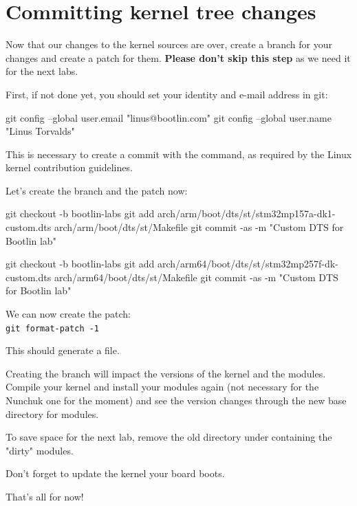 \section{Committing kernel tree changes}

Now that our changes to the kernel sources are over,
create a branch for your changes and create a patch for them.
{\bf Please don't skip this step} as we need it for the next labs.

First, if not done yet, you should set your identity
and e-mail address in git:

\begin{bashinput}
git config --global user.email "linus@bootlin.com"
git config --global user.name "Linus Torvalds"
\end{bashinput}

This is necessary to create a commit with the 
command, as required by the Linux kernel contribution guidelines.

Let's create the branch and the patch now:

\if{}
\begin{bashinput}
git checkout -b bootlin-labs
git add arch/arm/boot/dts/st/stm32mp157a-dk1-custom.dts arch/arm/boot/dts/st/Makefile
git commit -as -m "Custom DTS for Bootlin lab"
\end{bashinput}
\fi
\if{}
\begin{bashinput}
git checkout -b bootlin-labs
git add arch/arm64/boot/dts/st/stm32mp257f-dk-custom.dts arch/arm64/boot/dts/st/Makefile
git commit -as -m "Custom DTS for Bootlin lab"
\end{bashinput}
\fi

We can now create the patch:\\
\texttt{git format-patch -1}

This should generate a 
file.

Creating the branch will impact the versions of the kernel and the modules.
Compile your kernel and install your modules again (not necessary for the
Nunchuk one for the moment) and see the version changes through the
new base directory for modules.

To save space for the next lab, remove the old directory under
 containing the "dirty" modules.

Don't forget to update the kernel your board boots.

That's all for now!
